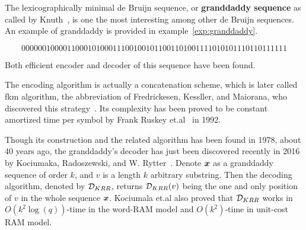 The lexicographically minimal de Bruijn sequence, or \textbf{granddaddy sequence} as called by Knuth~\cite{knuth2013art}, is one the most interesting among other de Bruijn sequences. An example of granddaddy is provided in example~\ref{exp:granddaddy}.
\begin{example}\label{exp:granddaddy}
    \[0000001000011000101000111001001011001101001111010101110110111111\]    
\end{example}
Both efficient encoder and decoder of this sequence have been found.

The encoding algorithm is actually a concatenation scheme, which is later called \gls{fkm} algorithm, the abbreviation of Fredrickesen, Kessller, and Maiorana, who discovered this strategy~\cite{fredricksen1978necklaces,fredricksen1986algorithm}. Its complexity has been proved to be constant amortized time per symbol by Frank Ruskey et.al~\cite{ruskey1992generating} in 1992.

Though its construction and the related algorithm has been found in 1978, about 40 years ago, the granddaddy's decoder has just been discovered recently in 2016 by Kociumaka, Radoszewski, and W. Rytter~\cite{kociumaka2016efficient}. Denote ${\boldsymbol x}$ as a granddaddy sequence of order $k$, and $v$ is a length $k$ arbitrary substring. Then the decoding algorithm, denoted by ${\cal D}_{KRR}$, returns ${\cal D}_{KRR}(v)$ being the one and only position of $v$ in the whole sequence ${\boldsymbol x}$. Kociumala et.al also proved that ${\cal D}_{KRR}$ works in $O(k^2\log(q))$-time in the word-RAM model and $O(k^{2})$-time in unit-cost RAM model.